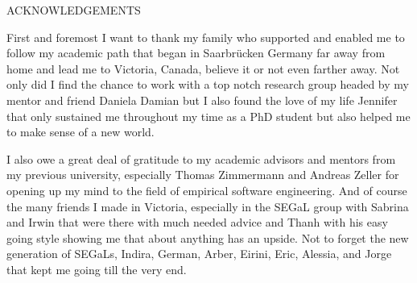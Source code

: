 \newpage
{}

\begin{center}
ACKNOWLEDGEMENTS
\end{center}

First and foremost I want to thank my family who supported and enabled me to follow my academic path that began in Saarbr{\"u}cken Germany far away from home and lead me to Victoria, Canada, believe it or not even farther away.
%
Not only did I find the chance to work with a top notch research group headed by my mentor and friend Daniela Damian but I also found the love of my life Jennifer that only sustained me throughout my time as a PhD student but also helped me to make sense of a new world.

I also owe a great deal of gratitude to my academic advisors and mentors from my previous university, especially Thomas Zimmermann and Andreas Zeller for opening up my mind to the field of empirical software engineering.
%
And of course the many friends I made in Victoria, especially in the SEGaL group with Sabrina and Irwin that were there with much needed advice and Thanh with his easy going style showing me that about anything has an upside.
Not to forget the new generation of SEGaLs, Indira, German, Arber, Eirini, Eric, Alessia, and Jorge that kept me going till the very end.




